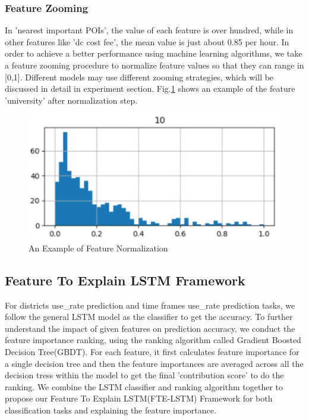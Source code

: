 \documentclass[runningheads]{llncs}
\begin{document}
\subsubsection{Feature Zooming}
In 'nearest important POIs', the value of each feature is over hundred, while in other features like 'dc cost fee', the mean value is just about 0.85 per hour. In order to achieve a better performance using machine learning algorithms, we take a feature zooming procedure to normalize feature values so that they can range in [0,1]. Different models may use different zooming strategies, which will be discussed in detail in experiment section. Fig.\ref{fig8} shows an example of the feature 'university' after normalization step.
\begin{figure}[!htp]
	\includegraphics[width=\columnwidth]{./figures/uni.pdf}
	\centering
	\caption{An Example of Feature Normalization}
	\label{fig8}
\end{figure}
\subsection{Feature To Explain LSTM Framework}
For districts use\_rate prediction and time frames use\_rate  prediction tasks, we follow the general LSTM model\cite{LSTM} as the classifier to get the accuracy. To further understand the impact of given features on prediction accuracy, we conduct the feature importance ranking, using the ranking algorithm called Gradient Boosted Decision Tree(GBDT). For each feature, it first calculates feature importance for a single decision tree and then the feature importances are averaged across all the decision tress within the model to get the final 'contribution score' to do the ranking. We combine the LSTM classifier and ranking algorithm together to propose our Feature To Explain LSTM(FTE-LSTM) Framework for both classification tasks and explaining the feature importance.
\end{document}
